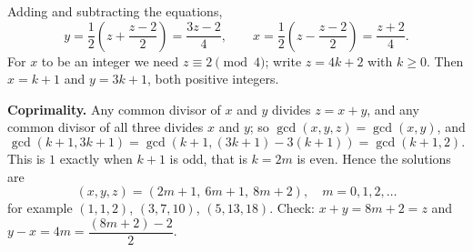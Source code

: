 Adding and subtracting the equations,
\[
y=\dfrac{1}{2}\left(z+\dfrac{z-2}{2}\right)=\dfrac{3z-2}{4},\qquad x=\dfrac{1}{2}\left(z-\dfrac{z-2}{2}\right)=\dfrac{z+2}{4}.
\]
For $x$ to be an integer we need $z\equiv2\pmod4$; write $z=4k+2$ with $k\ge0$. Then $x=k+1$ and $y=3k+1$, both positive integers.

\textbf{Coprimality.} Any common divisor of $x$ and $y$ divides $z=x+y$, and any common divisor of all three divides $x$ and $y$; so $\gcd(x,y,z)=\gcd(x,y)$, and
\[
\gcd(k+1,3k+1)=\gcd(k+1,(3k+1)-3(k+1))=\gcd(k+1,2).
\]
This is $1$ exactly when $k+1$ is odd, that is $k=2m$ is even. Hence the solutions are
\[
\boxed{(x,y,z)=(2m+1,\ 6m+1,\ 8m+2),\quad m=0,1,2,\dots}
\]
for example $(1,1,2)$, $(3,7,10)$, $(5,13,18)$. Check: $x+y=8m+2=z$ and $y-x=4m=\dfrac{(8m+2)-2}{2}$.
